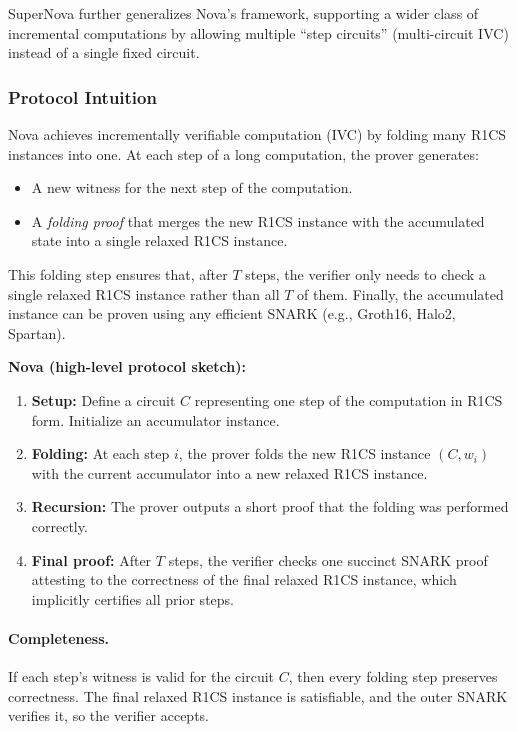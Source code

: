 SuperNova further generalizes Nova’s framework, supporting a wider class of incremental computations by allowing multiple “step circuits” (multi-circuit IVC) instead of a single fixed circuit.

\subsubsection*{Protocol Intuition}

Nova achieves incrementally verifiable computation (IVC) by folding many R1CS instances into one.  
At each step of a long computation, the prover generates:
\begin{itemize}
    \item A new witness for the next step of the computation.
    \item A \emph{folding proof} that merges the new R1CS instance with the accumulated state into a single relaxed R1CS instance.
\end{itemize}

This folding step ensures that, after $T$ steps, the verifier only needs to check a single relaxed R1CS instance rather than all $T$ of them.  
Finally, the accumulated instance can be proven using any efficient SNARK (e.g., Groth16, Halo2, Spartan).  

\begin{protocol}
\textbf{Nova (high-level protocol sketch):}
\begin{enumerate}
    \item \textbf{Setup:} Define a circuit $C$ representing one step of the computation in R1CS form. Initialize an accumulator instance.
    \item \textbf{Folding:} At each step $i$, the prover folds the new R1CS instance $(C, w_i)$ with the current accumulator into a new relaxed R1CS instance.
    \item \textbf{Recursion:} The prover outputs a short proof that the folding was performed correctly.
    \item \textbf{Final proof:} After $T$ steps, the verifier checks one succinct SNARK proof attesting to the correctness of the final relaxed R1CS instance, which implicitly certifies all prior steps.
\end{enumerate}
\end{protocol}

\paragraph{Completeness.}  
If each step’s witness is valid for the circuit $C$, then every folding step preserves correctness.  
The final relaxed R1CS instance is satisfiable, and the outer SNARK verifies it, so the verifier accepts.  

